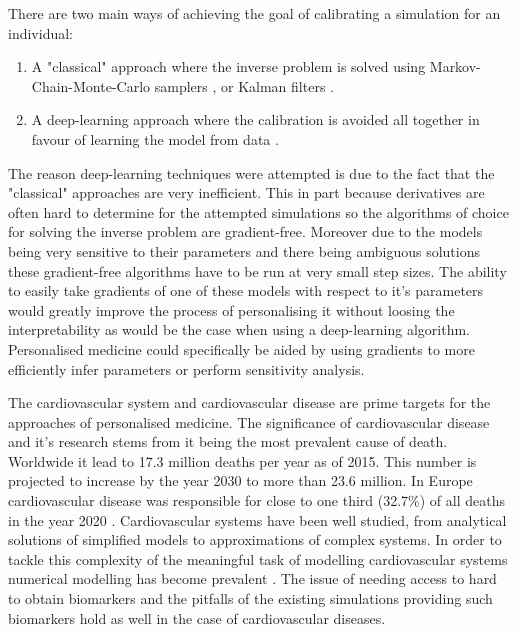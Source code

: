 \documentclass[a4paper, oneside]{discothesis}
\begin{document}
There are two main ways of achieving the goal of calibrating a simulation for an individual:
\begin{enumerate}
	\item A "classical" approach where the inverse problem is solved using Markov-Chain-Monte-Carlo samplers \cite{melis2017gaussian}, or Kalman filters \cite{manganotti2022modeling}.
	\item A deep-learning approach where the calibration is avoided all together in favour of learning the model from data \cite{kissas2020machine,arzani2022machine}.
\end{enumerate}
The reason deep-learning techniques were attempted is due to the fact that the "classical" approaches are very inefficient.
This in part because derivatives are often hard to determine for the attempted simulations so the algorithms of choice for solving the inverse problem are gradient-free. 
Moreover due to the models being very sensitive to their parameters and there being ambiguous solutions \cite{nolte2022inverse,quick2001infinite} these gradient-free algorithms have to be run at very small step sizes. \cite{taylor2009patient,tuccio2022parameter,marsden2014optimization,mineroff2019optimization,bozkurt2022patient}
The ability to easily take gradients of one of these models with respect to it's parameters would greatly improve the process of personalising it without loosing the interpretability as would be the case when using a deep-learning algorithm.
Personalised medicine could specifically be aided by using gradients to more efficiently infer parameters or perform sensitivity analysis.

The cardiovascular system and cardiovascular disease are prime targets for the approaches of personalised medicine. 
The significance of cardiovascular disease and it's research stems from it being the most prevalent cause of death.
Worldwide it lead to 17.3 million deaths per year as of 2015.
This number is projected to increase by the year 2030 to more than 23.6 million. \cite{update2015heart}
In Europe cardiovascular disease was responsible for close to one third (32.7\%) of all deaths in the year 2020 \cite{Coelho2020}.
Cardiovascular systems have been well studied, from analytical solutions of simplified models to approximations of complex systems.
In order to tackle this complexity of the meaningful task of modelling cardiovascular systems numerical modelling has become prevalent \cite{formaggia2009multiscale,quarteroni2016geometric,black2020p14,el2018investigating,qureshi2014numerical,reichold2009vascular}.
The issue of needing access to hard to obtain biomarkers and the pitfalls of the existing simulations providing such biomarkers hold as well in the case of cardiovascular diseases.
\end{document}
